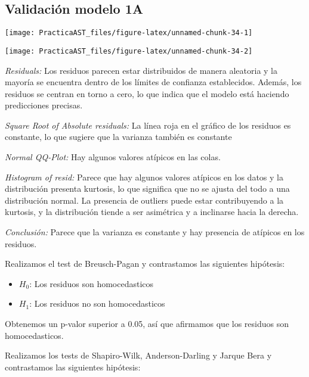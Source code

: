 \documentclass[
]{article}
\providecommand{\tightlist}{%
  \setlength{\itemsep}{0pt}\setlength{\parskip}{0pt}}
\begin{document}
\hypertarget{validaciuxf3n-modelo-1a}{%
\subsection{Validación modelo 1A}\label{validaciuxf3n-modelo-1a}}

\begin{center}\texttt{[image: PracticaAST\_files/figure-latex/unnamed-chunk-34-1]} \end{center}

\begin{center}\texttt{[image: PracticaAST\_files/figure-latex/unnamed-chunk-34-2]} \end{center}

\emph{Residuals:} Los residuos parecen estar distribuidos de manera
aleatoria y la mayoría se encuentra dentro de los límites de confianza
establecidos. Además, los residuos se centran en torno a cero, lo que
indica que el modelo está haciendo predicciones precisas.

\emph{Square Root of Absolute residuals:} La línea roja en el gráfico de
los residuos es constante, lo que sugiere que la varianza también es
constante

\emph{Normal QQ-Plot:} Hay algunos valores atípicos en las colas.

\emph{Histogram of resid:} Parece que hay algunos valores atípicos en
los datos y la distribución presenta kurtosis, lo que significa que no
se ajusta del todo a una distribución normal. La presencia de outliers
puede estar contribuyendo a la kurtosis, y la distribución tiende a ser
asimétrica y a inclinarse hacia la derecha.

\emph{Conclusión:} Parece que la varianza es constante y hay presencia
de atípicos en los residuos.

\medskip

Realizamos el test de Breusch-Pagan y contrastamos las siguientes
hipótesis:

\begin{itemize}
\tightlist
\item
  \(H_0\): Los residuos son homocedasticos
\item
  \(H_1\): Los residuos no son homocedasticos
\end{itemize}

Obtenemos un p-valor superior a 0.05, así que afirmamos que los residuos
son homocedasticos.

\medskip

Realizamos los tests de Shapiro-Wilk, Anderson-Darling y Jarque Bera y
contrastamos las siguientes hipótesis:
\end{document}
